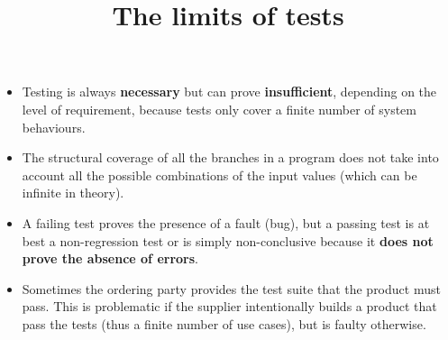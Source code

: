 \documentclass[wide]{slides}
\begin{document}
\begin{slide}
  \title{The limits of tests}

  \begin{itemize}

    \item Testing is always \textbf{necessary} but can prove
      \textbf{insufficient}, depending on the level of requirement,
      because tests only cover a finite number of system
      behaviours.

    \item The structural coverage of all the branches in a program
      does not take into account all the possible combinations of the
      input values (which can be infinite in theory).

    \item A failing test proves the presence of a fault (bug), but a
      passing test is at best a non\hyp{}regression test or is simply
      non\hyp{}conclusive because it \textbf{does not prove the
        absence of errors}.

    \item Sometimes the ordering party provides the test suite that
      the product must pass. This is problematic if the supplier
      intentionally builds a product that pass the tests (thus a
      finite number of use cases), but is faulty otherwise.


  \end{itemize}
\end{slide}
\end{document}
